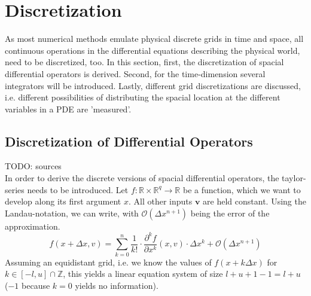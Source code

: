 \chapter{Discretization}\label{chapter:discretization}
As most numerical methods emulate physical discrete grids in time and space, all continuous operations in the differential equations describing the physical world, need to be discretized, too.
In this section, first, the discretization of spacial differential operators is derived.
Second, for the time-dimension several integrators will be introduced.
Lastly, different grid discretizations are discussed, i.e. different possibilities of distributing the spacial location at the different variables in a PDE are 'measured'.

\section{Discretization of Differential Operators}\label{section:diff_op}
TODO: sources\\
In order to derive the discrete versions of spacial differential operators, the taylor-series needs to be introduced.
Let $f:\mathbb{R}\times\mathbb{R}^q\rightarrow \mathbb{R}$ be a function, which we want to develop along its first argument $x$.
All other inputs $\boldsymbol{v}$ are held constant.
Using the Landau-notation, we can write, with $\mathcal{O}(\Delta x ^{n+1})$ being the error of the approximation.
\begin{equation}
f(x+\Delta x,v) = \sum_{k=0}^{n}\frac{1}{k!}\cdot\frac{\partial^k f}{\partial x ^k}(x,v)\cdot \Delta x^k + \mathcal{O}(\Delta x ^{n+1})
\end{equation}
Assuming an equidistant grid, i.e. we know the values of $f(x+k\Delta x)$ for $k\in [-l,u] \cap \mathbb{Z}$, this yields a linear equation system of size $l + u + 1 - 1= l + u$ ($-1$ because $k=0$ yields no information).

